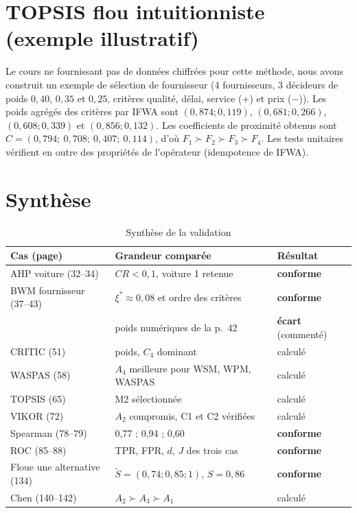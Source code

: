 \documentclass[11pt,a4paper]{report}
\newcommand{\ok}{\textcolor{okgreen}{\textbf{conforme}}}
\newcommand{\ecart}{\textcolor{warnorange}{\textbf{écart}}}
\theoremstyle{definition}
\theoremstyle{remark}
\begin{document}
\section{TOPSIS flou intuitionniste (exemple illustratif)}

Le cours ne fournissant pas de données chiffrées pour cette méthode, nous avons construit un exemple de
sélection de fournisseur (4 fournisseurs, 3 décideurs de poids $0{,}40$, $0{,}35$ et $0{,}25$, critères
qualité, délai, service (+) et prix ($-$)). Les poids agrégés des critères par IFWA sont
$(0{,}874;0{,}119)$, $(0{,}681;0{,}266)$, $(0{,}608;0{,}339)$ et $(0{,}856;0{,}132)$. Les coefficients
de proximité obtenus sont $C=(0{,}794;\ 0{,}708;\ 0{,}407;\ 0{,}114)$, d'où $F_1\succ F_2\succ F_3\succ
F_4$. Les tests unitaires vérifient en outre des propriétés de l'opérateur (idempotence de IFWA).

\section{Synthèse}

\begin{table}[H]
\centering
\caption{Synthèse de la validation}\label{tab:synthese}
\begin{tabularx}{\linewidth}{lXl}
\toprule
\textbf{Cas (page)} & \textbf{Grandeur comparée} & \textbf{Résultat}\\
\midrule
AHP voiture (32--34) & $CR<0{,}1$, voiture 1 retenue & \ok\\
BWM fournisseur (37--43) & $\xi^*\approx0{,}08$ et ordre des critères & \ok\\
 & poids numériques de la p.~42 & \ecart{} (commenté)\\
CRITIC (51) & poids, $C_4$ dominant & calculé\\
WASPAS (58) & $A_4$ meilleure pour WSM, WPM, WASPAS & calculé\\
TOPSIS (65) & M2 sélectionnée & calculé\\
VIKOR (72) & $A_2$ compromis, C1 et C2 vérifiées & calculé\\
Spearman (78--79) & 0,77 ; 0,94 ; 0,60 & \ok\\
ROC (85--88) & TPR, FPR, $d$, $J$ des trois cas & \ok\\
Floue une alternative (134) & $\tilde S=(0{,}74;0{,}85;1)$, $S=0{,}86$ & \ok\\
Chen (140--142) & $A_2\succ A_3\succ A_1$ & calculé\\
\bottomrule
\end{tabularx}
\end{table}
\end{document}
